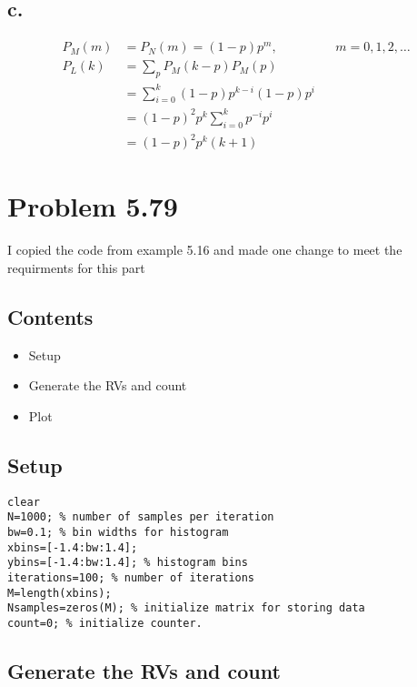 \documentclass[12pt]{article}
\begin{document}
\subsection{c.}
\begin{align*}
  P_M(m) &= P_N(m) = (1-p)p^m, & &  m = 0,1,2,\dots \\
  P_L(k) &= \sum_p P_M(k-p)P_M(p) \\
  &= \sum_{i=0}^k (1-p)p^{k-i}(1-p)p^i \\
  &= (1-p)^2p^k\sum_{i=0}^k p^{-i}p^i \\
  &= (1-p)^2p^k(k+1)
\end{align*}

\section*{Problem 5.79}

\begin{par}
I copied the code from example 5.16 and made one change to meet the requirments for this part
\end{par} \vspace{1em}

\subsection*{Contents}

\begin{itemize}
\setlength{\itemsep}{-1ex}
   \item Setup
   \item Generate the RVs and count
   \item Plot
\end{itemize}


\subsection*{Setup}

\begin{verbatim}
clear
N=1000; % number of samples per iteration
bw=0.1; % bin widths for histogram
xbins=[-1.4:bw:1.4];
ybins=[-1.4:bw:1.4]; % histogram bins
iterations=100; % number of iterations
M=length(xbins);
Nsamples=zeros(M); % initialize matrix for storing data
count=0; % initialize counter.
\end{verbatim}


\subsection*{Generate the RVs and count}
\end{document}
